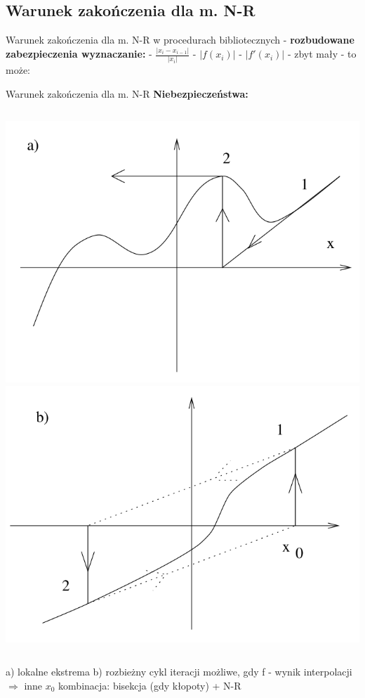 \subsection{Warunek zakończenia dla m. N-R}
\begin{frame}{Warunek zakończenia dla m. N-R}
	w procedurach bibliotecznych - \textbf{rozbudowane zabezpieczenia wyznaczanie:}\linebreak\linebreak
	- $\frac{\lvert x_{i} - x_{i-1} \rvert}{\lvert x_{i} \rvert}$\linebreak\linebreak
	- $\lvert f(x_{i}) \rvert$\linebreak\linebreak
	- $\lvert f'(x_{i}) \rvert$ - zbyt mały - to może:\linebreak\linebreak
\end{frame}
\begin{frame}{Warunek zakończenia dla m. N-R}
	\textbf{Niebezpieczeństwa:}\linebreak
	\begin{columns}
		\centering   \includegraphics[width=.7\linewidth]{img/7/7_4_2}
		\includegraphics[width=.7\linewidth]{img/7/7_4_3}
	\end{columns}
	a) lokalne ekstrema\linebreak
	b) rozbieżny cykl iteracji możliwe, gdy f - wynik interpolacji $\Rightarrow$ inne $x_{0}$ \linebreak kombinacja: bisekcja (gdy kłopoty) + N-R
\end{frame}